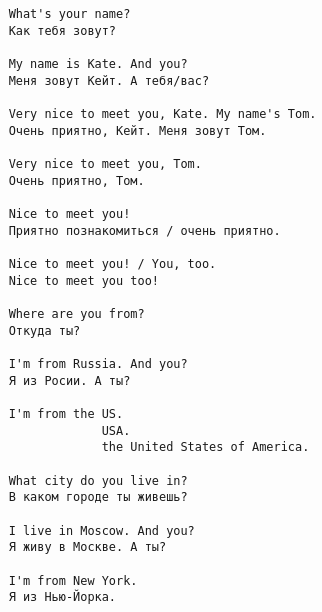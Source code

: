 \subsection*{}
\begin{verbatim}
    What's your name?
    Как тебя зовут?

    My name is Kate. And you?
    Меня зовут Кейт. А тебя/вас?

    Very nice to meet you, Kate. My name's Tom.
    Очень приятно, Кейт. Меня зовут Том.

    Very nice to meet you, Tom.
    Очень приятно, Том.

    Nice to meet you!
    Приятно познакомиться / очень приятно.

    Nice to meet you! / You, too.
    Nice to meet you too!
    
    Where are you from?
    Откуда ты?

    I'm from Russia. And you?
    Я из Росии. А ты?

    I'm from the US.
                 USA.
                 the United States of America.
    
    What city do you live in?
    В каком городе ты живешь?

    I live in Moscow. And you?
    Я живу в Москве. А ты?

    I'm from New York.
    Я из Нью-Йорка.
\end{verbatim}